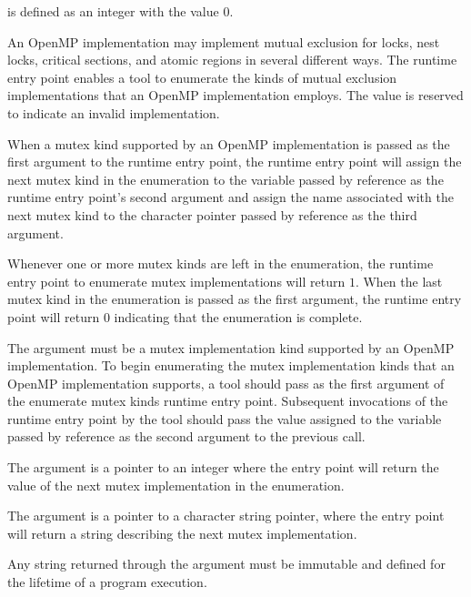  is defined as an integer with the value 0.

\descr
An OpenMP implementation may implement mutual exclusion for locks,
nest locks, critical sections, and atomic regions in several different
ways.  The  runtime entry point
enables a tool to enumerate the
kinds of mutual exclusion implementations that an OpenMP implementation
employs.
The value  is reserved to indicate an invalid
implementation.



When a mutex kind supported by an OpenMP implementation is passed
as the first argument to the runtime entry point,
the runtime entry point will assign the next mutex kind in the enumeration to
the variable passed by reference as the runtime entry point's second argument
and assign the name associated with the next mutex kind
to the character pointer passed by reference as the third argument.

Whenever one or more mutex kinds are left in the enumeration,
the runtime entry point to enumerate mutex implementations will return $1$.
When the last mutex kind in the enumeration is passed
as the first argument, the runtime entry point will return $0$
indicating that the enumeration is complete.

\argdesc

The argument  must be a mutex implementation
kind supported by an OpenMP implementation.  To begin enumerating the
mutex implementation kinds that an OpenMP implementation supports, a
tool should pass  as the first
argument of the enumerate mutex kinds runtime entry point.  Subsequent
invocations of the runtime entry point by the tool should pass the
value assigned to the variable passed by reference as the second
argument to the previous call.

The argument  is a pointer to an integer where
the entry point will return the value of the next mutex implementation
in the enumeration.

The argument  is a pointer to a character
string pointer, where the entry point will return a string describing
the next mutex implementation.

\constraints
Any string returned through the argument
 must be immutable and defined
for the lifetime of a program execution.

\label{sec:ompt_set_callback_t}
\label{sec:ompt_set_callback}

